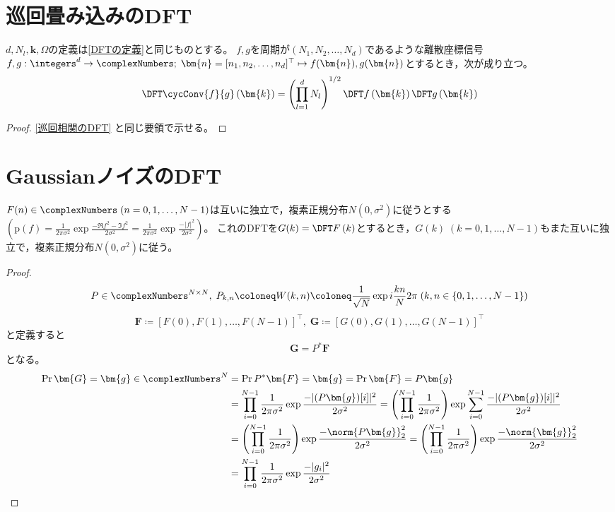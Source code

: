     \section{巡回畳み込みのDFT}
        \begin{shadebox}
            $d,N_l,\bm{k},\Omega$の定義は\ref{DFTの定義}と同じものとする。
            $f,g$を周期が$(N_1,N_2,\dots,N_d)$であるような離散座標信号$f,g: \integers^d\to\complexNumbers;\;\bm{n} = [n_1,n_2,\dots,n_d]^\top \mapsto f(\bm{n}),g(\bm{n})$とするとき，次が成り立つ。
            \[ \DFTwithArg{\cycConv{f}{g}}{\bm{k}} = \left(\prod_{l=1}^d N_l\right)^{1/2}\DFTwithArg{f}{\bm{k}}\DFTwithArg{g}{\bm{k}} \]
        \end{shadebox}
        \begin{proof}
            \quad\par
            \ref{巡回相関のDFT} と同じ要領で示せる。
        \end{proof}
    \section{GaussianノイズのDFT}
        \begin{shadebox}
            $F(n) \in \complexNumbers\;(n=0,1,\dots,N-1)$は互いに独立で，複素正規分布$N(0,\sigma^2)$に従うとする$\left(\text{p}(f) = \frac{1}{2\pi\sigma^2}\exp\frac{-\Re{f}^2-\Im{f}^2}{2\sigma^2} = \frac{1}{2\pi\sigma^2}\exp\frac{-|f|^2}{2\sigma^2}\right)$。
            これのDFTを$G(k) = \DFTwithArg{F}{k}$とするとき，$G(k)\;(k=0,1,\dots,N-1)$もまた互いに独立で，複素正規分布$N(0,\sigma^2)$に従う。
        \end{shadebox}
        \begin{proof}
            \[ P \in \complexNumbers^{N\times N},\; P_{k,n} \coloneq W(k,n) \coloneq \frac{1}{\sqrt{N}}\exp i\frac{kn}{N}2\pi\;(k,n \in \{0,1,\dots,N-1\}) \]
            \[ \bm{F} \coloneq [F(0), F(1), \dots, F(N-1)]^\top,\;\bm{G} \coloneq [G(0), G(1), \dots, G(N-1)]^\top \]
            と定義すると
            \[ \bm{G} = P^*\bm{F} \]
            となる。
            \begin{align*}
                \Pr{\bm{G} = \bm{g} \in \complexNumbers^N} &= \Pr{P^*\bm{F} = \bm{g}} = \Pr{\bm{F} = P\bm{g}} \\
                &= \prod_{i=0}^{N-1}\frac{1}{2\pi\sigma^2} \exp\frac{-|(P\bm{g})[i]|^2}{2\sigma^2} = \left(\prod_{i=0}^{N-1}\frac{1}{2\pi\sigma^2}\right) \exp \sum_{i=0}^{N-1} \frac{-|(P\bm{g})[i]|^2}{2\sigma^2} \\
                &= \left(\prod_{i=0}^{N-1}\frac{1}{2\pi\sigma^2}\right) \exp \frac{-\norm{P\bm{g}}_2^2}{2\sigma^2} = \left(\prod_{i=0}^{N-1}\frac{1}{2\pi\sigma^2}\right) \exp \frac{-\norm{\bm{g}}_2^2}{2\sigma^2} \\
                &= \prod_{i=0}^{N-1}\frac{1}{2\pi\sigma^2} \exp \frac{-|g_i|^2}{2\sigma^2}
            \end{align*}
        \end{proof}